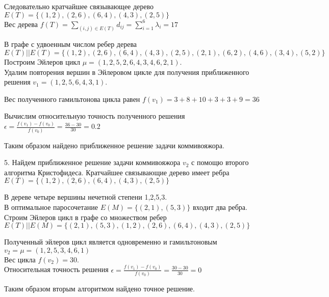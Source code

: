\documentclass[a4paper,10pt]{article} %
\begin{document}
Следовательно кратчайшее связывающее дерево
$E(T) = \{ (1,2), (2,6), (6,4), (4,3),(2,5) \} $ \\
Вес дерева 
$f(T) = \sum_{(i,j) \in E(T)} d_{ij}  = \sum_{i=1}^{6} \lambda_i = 17 $

\bigskip
\bigskip

В графе с удвоенным числом ребер дерева \\
$ E(T) || E(T) = \{ 
 (1,2), (2,6), (6,4),(4,3),(2,5)
,(2,1), (6,2), (4,6),(3,4),(5,2)
\}$ \\
Построим Эйлеров цикл $\mu = (1,2,5,2,6,4,3,4,6,2,1)$. \\
Удалим повторения вершин в Эйлеровом цикле для получения приближенного решения $v_1 = (1,2,5,6,4,3,1)$. 

\smallskip 

Вес полученного гамильтонова цикла равен 
$f(v_1) = 3 + 8 + 10 + 3 + 3 + 9 = 36 $

Вычислим относительную точность полученного решения
$ \epsilon = \frac{f(v_1) - f(v_0)}{f(v_0)} = \frac{36 - 30}{30} = 0.2 $

\smallskip

Таким образом найдено приближенное решение задачи коммивояжора.

\bigskip

5. \qquad Найдем приближенное решение задачи коммивояжора $v_2$ с помощю второго алгоритма Кристофидеса.
Кратчайшее связывающие дерево имеет ребра
$E(T) = \{ (1,2), (2,6), (6,4), (4,3),(2,5) \}  $

В дереве четыре вершины нечетной степени 1,2,5,3. \\
В оптимальное паросочетание $E(M) = \{(2,1), (5,3)\}$ входит два ребра.
Строим Эйлеров цикл в графе со множеством ребер \\
$E(T) || E(M) = \{ (2,1),(5,3),(1,2),(2,6), (6,4), (4,3),(2,5) \} $

\smallskip 

Полученный эйлеров цикл является одновременно и гамильтоновым
$v_2 = \mu = (1,2,5,3,4,6,1) $ \\
Вес цикла $f(v_2) = 30$. \\
Относительная точность решения $ \epsilon = \frac{f(v_1) - f(v_0)}{f(v_0)} = \frac{30 - 30}{30} = 0$ \\

\smallskip

Таким образом вторым алгоритмом найдено точное решение.
\end{document}
